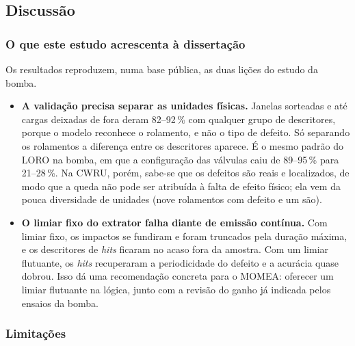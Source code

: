 \subsection{Discussão}
\label{cwru:sec:discussao}

\subsubsection{O que este estudo acrescenta à dissertação}

Os resultados reproduzem, numa base pública, as duas lições do estudo da bomba.
\begin{itemize}
	\item \textbf{A validação precisa separar as unidades físicas.} Janelas sorteadas e até cargas deixadas de fora deram 82--92\,\% com qualquer grupo de descritores, porque o modelo reconhece o rolamento, e não o tipo de defeito. Só separando os rolamentos a diferença entre os descritores aparece. É o mesmo padrão do LORO na bomba, em que a configuração das válvulas caiu de 89--95\,\% para 21--28\,\%. Na CWRU, porém, sabe-se que os defeitos são reais e localizados, de modo que a queda não pode ser atribuída à falta de efeito físico; ela vem da pouca diversidade de unidades (nove rolamentos com defeito e um são).
	\item \textbf{O limiar fixo do extrator falha diante de emissão contínua.} Com limiar fixo, os impactos se fundiram e foram truncados pela duração máxima, e os descritores de \textit{hits} ficaram no acaso fora da amostra. Com um limiar flutuante, os \textit{hits} recuperaram a periodicidade do defeito e a acurácia quase dobrou. Isso dá uma recomendação concreta para o MOMEA: oferecer um limiar flutuante na lógica, junto com a revisão do ganho já indicada pelos ensaios da bomba.
\end{itemize}

\subsubsection{Limitações}

